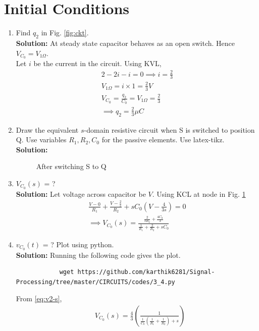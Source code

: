 \documentclass[journal,12pt,twocolumn]{IEEEtran}
\newcommand{\solution}{\noindent \textbf{Solution: }}
\providecommand{\brak}[1]{\ensuremath{\left(#1\right)}}
\numberwithin{equation}{section}
\renewcommand\thesection{\arabic{section}}
\begin{document}
	\section{Initial Conditions}
	\begin{enumerate}[label=\arabic*.,ref=\thesection.\theenumi]
		\item Find $q_2$ in Fig. \ref{fig:ckt}.\\
		\solution At steady state capacitor behaves as an open switch. Hence $V_{C_0}=V_{1 \Omega}$.\\
		Let $i$ be the current in the circuit. Using KVL,
		\begin{align}
			2-2i-i=0 \implies i=\frac{2}{3}\\
			V_{1 \Omega}=i \times 1= \frac{2}{3} V\\
			V_{C_0}=\frac{q_2}{C_0}=V_{1 \Omega}=\frac{2}{3}\\
			\implies q_2=\frac{2}{3} \mu C
		\end{align}
		\item Draw the equivalent $s$-domain resistive circuit when S is switched to position Q.  Use variables $R_1, R_2, C_0$ for the passive elements.
		Use latex-tikz.
		\label{prob:init}
		\\\solution 
		\begin{figure}[!ht]
			\centering
			
			\caption{After switching S to Q}
			\label{fig:sq}
		\end{figure}
		\item $V_{C_0}(s)$ = ? \\
		\solution Let voltage across capacitor be $V$. Using KCL at node in Fig. \ref{fig:sq}
		\begin{align}
			\frac{V - 0}{R_1} + \frac{V - \frac{2}{s}}{R_2} + sC_0\brak{V - \frac{4}{3s}} = 0 \\
			\implies V_{C_0}(s) = \frac{\frac{2}{sR_2} + \frac{4C_0}{3}}{\frac{1}{R_1} + \frac{2}{R_2} + sC_0}
			\label{eq:v2-s}
		\end{align} 
		\item $v_{C_0}(t)$ = ? Plot using python.\\
		\solution Running the following code gives the plot.
		\begin{lstlisting}
			wget https://github.com/karthik6281/Signal-Processing/tree/master/CIRCUITS/codes/3_4.py
		\end{lstlisting}
		From \eqref{eq:v2-s},
		\begin{align}
			&V_{C_0}(s) = \frac{4}{3}\brak{\frac{1}{\frac{1}{C_0}\brak{\frac{1}{R_1} + \frac{1}{R_2}}+s}} \nonumber \\

\end{align}
\end{enumerate}
\end{document}
